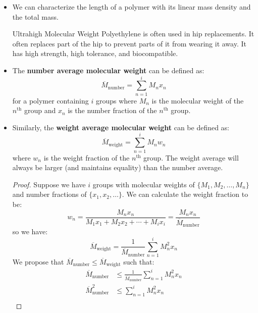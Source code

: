 \begin{itemize}
\begin{itemize}
\begin{case}
    \end{case}
    \end{itemize}
    \item We can characterize the length of a polymer with its linear mass density and the total mass.
    \begin{case}
        Ultrahigh Molecular Weight Polyethylene is often used in hip replacements. It often replaces part of the hip to prevent parts of it from wearing it away. It has high strength, high tolerance, and biocompatible. 
    \end{case}
    \item The \textbf{number average molecular weight} can be defined as:
    \begin{equation}
        \overline{M}_\text{number} = \sum_{n=1}^i M_nx_n
    \end{equation}
    for a polymer containing $i$ groups where $M_n$ is the molecular weight of the $n^\text{th}$ group and $x_n$ is the number fraction of the $n^\text{th}$ group.
    \item Similarly, the \textbf{weight average molecular weight} can be defined as:
    \begin{equation}
        \overline{M}_\text{weight} = \sum_{n=1}^i M_nw_n
    \end{equation}
    where $w_n$ is the weight fraction of the $n^\text{th}$ group. The weight average will always be larger (and maintains equality) than the number average.
    \begin{proof}
        Suppose we have $i$ groups with molecular weights of $\{M_1, M_2, \dots, M_n\}$ and number fractions of $\{x_1, x_2, \dots \}$. We can calculate the weight fraction to be:
        \begin{equation}
            w_n = \frac{M_nx_n}{M_1x_1+M_2x_2 + \cdots +M_ix_i} = \frac{M_nx_n}{\overline{M}_\text{number}}
        \end{equation}
        so we have:
        \begin{equation}
            \overline{M}_\text{weight} = \frac{1}{\overline{M}_\text{number}}\sum_{n=1}^i  M^2_nx_n
        \end{equation}
        We propose that $\overline{M}_\text{number} \le \overline{M}_\text{weight}$ such that:
        \begin{align}
            \overline{M}_\text{number} & \le  \frac{1}{\overline{M}_\text{number}}\sum_{n=1}^i  M^2_nx_n \\ 
            \overline{M}^2_\text{number} &\le \sum_{n=1}^iM^2_nx_n \\ 

\end{align}
\end{proof}
\end{itemize}
